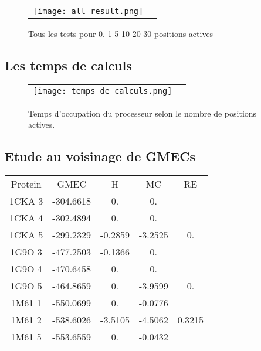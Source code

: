     \begin{figure}[h]
      \centering
      \begin{tabular}{cc}
        \texttt{[image: all\_result.png]} 
      \end{tabular}
      
      \caption{Tous les tests pour 0. 1 5 10 20 30 positions actives}
\label{graph:all_result}
    \end{figure}




    \subsection{Les temps de calculs} 
    
    \begin{figure}[h]
      \centering
      \begin{tabular}{cc}
        \texttt{[image: temps\_de\_calculs.png]} &
      \end{tabular}
      
      \caption{Temps d'occupation du processeur selon le nombre de positions actives.}
\label{graph:temps_CPU}
    \end{figure}


   \subsection{Etude au voisinage de GMECs}


    \begin{table}[h]
      \centering

      \begin{tabular}{ccccc}


        \toprule
        Protein & GMEC & H & MC & RE \\
        \cmidrule{1-5}
        1CKA 3 & -304.6618 & 0. & 0. & \\
        1CKA 4 & -302.4894 & 0. & 0. & \\
        1CKA 5 & -299.2329 & -0.2859 & -3.2525 & 0. \\
        1G9O 3 & -477.2503 & -0.1366 & 0. & \\
        1G9O 4 & -470.6458 & 0. & 0. & \\
        1G9O 5 & -464.8659 & 0. & -3.9599 &  0. \\
        1M61 1 & -550.0699 & 0. & -0.0776 & \\
        1M61 2 & -538.6026 & -3.5105 & -4.5062 & 0.3215 \\
        1M61 5 & -553.6559 & 0. & -0.0432 & \\
        \bottomrule       
      \end{tabular}      
\label{tab:voisinnage_rappel}      
    \end{table}


